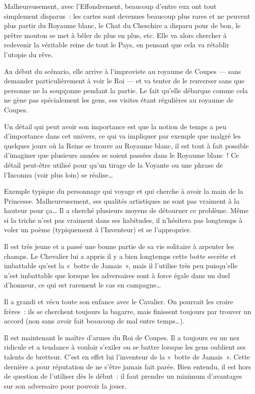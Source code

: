 {{Malheureusement, avec l’Effondrement, beaucoup d’entre eux ont tout simplement disparus~:  les cartes sont devenues beaucoup plus rares et ne peuvent plus partir du Royaume blanc, le Chat du Cheschire a disparu pour de bon, le prêtre mouton se met à bêler de plus en plus, etc.
Elle va alors chercher à redevenir la véritable reine de tout le Pays, en pensant que cela va rétablir l’utopie du rêve.

Au début du scénario, elle arrive à l’improviste au royaume de Coupes — sans demander particulièrement à voir le Roi — et va tenter de le renverser sans que personne ne la soupçonne pendant la partie.
Le fait qu’elle débarque comme cela ne gène pas spécialement les gens, ses visites étant régulières au royaume de Coupes.

Un détail qui peut avoir son importance est que la notion de temps a peu d’importance dans cet univers, ce qui va impliquer par exemple que malgré les quelques jours où la Reine se trouve au Royaume blanc, il est tout à fait possible d’imaginer que plusieurs années se soient passées dans le Royaume blanc~!
Ce détail peut-être utilisé pour qu’un tirage de la Voyante ou une phrase de l’Inconnu (voir plus loin) se réalise…
}

{
Exemple typique du personnage qui voyage et qui cherche à avoir la main de la Princesse.
Malheureusement, ses qualités artistiques ne sont pas vraiment à la hauteur pour ça…
Il a cherché plusieurs moyens de détourner ce problème.
Même si la triche n’est pas vraiment dans ses habitudes, il n’hésitera pas longtemps à voler un poème (typiquement à l’Inventeur) et se l’approprier.

Il est très jeune et a passé une bonne partie de sa vie solitaire à arpenter les champs.
Le Chevalier lui a appris il y a bien longtemps cette botte secrète et imbattable qu’est la «~botte de Jamais~», mais il l’utilise très peu puisqu’elle n’est imbattable que lorsque les adversaires sont à force égale dans un duel d’honneur, ce qui est rarement le cas en campagne…
}

{
Il a grandi et vécu toute son enfance avec le Cavalier.
On pourrait les croire frères~:  ils se cherchent toujours la bagarre, mais finissent toujours par trouver un accord (non sans avoir fait beaucoup de mal entre temps…).

Il est maintenant le maître d’armes du Roi de Coupes.
Il a toujours eu un nez ridicule et a tendance à vouloir s’exiler ou se battre lorsque les gens oublient ses talents de bretteur.
C’est en effet lui l’inventeur de la «~botte de Jamais~».
Cette dernière a pour réputation de ne s’être jamais fait parée.  Bien entendu, il est hors de question de l’utiliser dès le début~:  il faut prendre un minimum d’avantages sur son adversaire pour pouvoir la jouer.

}}
